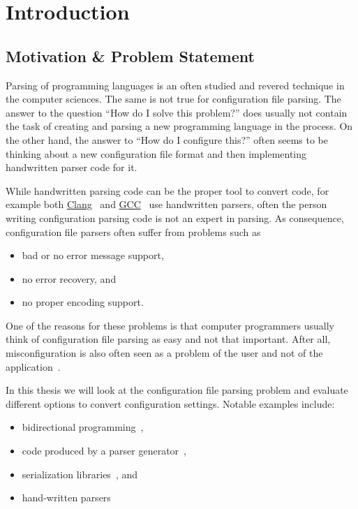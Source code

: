 \chapter{Introduction}

\section{Motivation \& Problem Statement}

Parsing of programming languages is an often studied and revered technique in the computer sciences. The same is not true for configuration file parsing. The answer to the question “How do I solve this problem?” does usually not contain the task of creating and parsing a new programming language in the process. On the other hand, the answer to “How do I configure this?” often seems to be thinking about a new configuration file format and then implementing handwritten parser code for it.

While handwritten parsing code can be the proper tool to convert code, for example both \href{http://clang.llvm.org}{Clang}~\cite{bendersky2012clang} and \href{http://gcc.gnu.org}{GCC}~\cite{myers2008cparser} use handwritten parsers, often the person writing configuration parsing code is not an expert in parsing. As consequence, configuration file parsers often suffer from problems such as

\begin{itemize}
  \item bad or no error message support,
  \item no error recovery, and
  \item no proper encoding support.
\end{itemize}

One of the reasons for these problems is that computer programmers usually think of configuration file parsing as easy and not that important. After all, misconfiguration is also often seen as a problem of the user and not of the application~\cite{xu2013not}.

In this thesis we will look at the configuration file parsing problem and evaluate different options to convert configuration settings. Notable examples include:

\begin{itemize}
  \item bidirectional programming~\cite{foster2005combinators, bohannon2006relational, lutterkort2008augeas, ko2016bigul, raab2016improving},
  \item code produced by a parser generator~\cite{denny2008ielr, parr2014adaptive, warth2016modular, bates2017aprt},
  \item serialization libraries~\cite{sumaray2012cds, pacini2015performance}, and
  \item hand-written parsers~\cite{myers2008cparser, bendersky2012clang}
\end{itemize}

